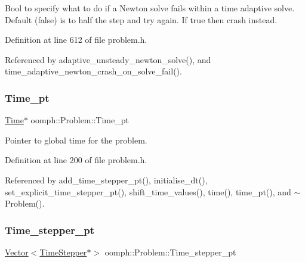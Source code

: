 Bool to specify what to do if a Newton solve fails within a time adaptive solve. Default (false) is to half the step and try again. If true then crash instead. 



Definition at line 612 of file problem.\+h.



Referenced by adaptive\+\_\+unsteady\+\_\+newton\+\_\+solve(), and time\+\_\+adaptive\+\_\+newton\+\_\+crash\+\_\+on\+\_\+solve\+\_\+fail().

\mbox{\label{classoomph_1_1Problem_ae33fbf5f34a7d06d88ad2c98538bbbe8}} 
\subsubsection{\texorpdfstring{Time\+\_\+pt}{Time\_pt}}
{\footnotesize\ttfamily \hyperlink{classoomph_1_1Time}{Time}$\ast$ oomph\+::\+Problem\+::\+Time\+\_\+pt\hspace{0.3cm}{\ttfamily [private]}}



Pointer to global time for the problem. 



Definition at line 200 of file problem.\+h.



Referenced by add\+\_\+time\+\_\+stepper\+\_\+pt(), initialise\+\_\+dt(), set\+\_\+explicit\+\_\+time\+\_\+stepper\+\_\+pt(), shift\+\_\+time\+\_\+values(), time(), time\+\_\+pt(), and $\sim$\+Problem().

\mbox{\label{classoomph_1_1Problem_af1e8f8a739453250eb3744fea2a3b983}} 
\subsubsection{\texorpdfstring{Time\+\_\+stepper\+\_\+pt}{Time\_stepper\_pt}}
{\footnotesize\ttfamily \hyperlink{classoomph_1_1Vector}{Vector}$<$\hyperlink{classoomph_1_1TimeStepper}{Time\+Stepper}$\ast$$>$ oomph\+::\+Problem\+::\+Time\+\_\+stepper\+\_\+pt\hspace{0.3cm}{\ttfamily [private]}}



